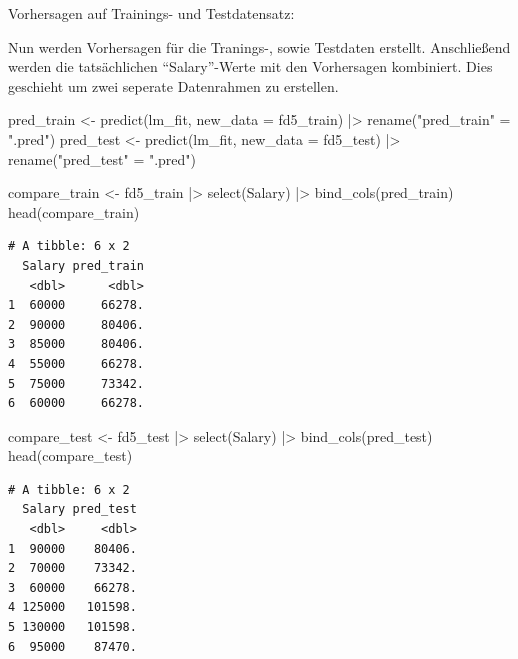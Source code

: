 \documentclass[
  letterpaper,
  DIV=11,
  numbers=noendperiod]{scrartcl}
\newenvironment{Shaded}{\begin{snugshade}}{\end{snugshade}}
\newcommand{\AttributeTok}[1]{\textcolor[rgb]{0.40,0.45,0.13}{#1}}
\newcommand{\FunctionTok}[1]{\textcolor[rgb]{0.28,0.35,0.67}{#1}}
\newcommand{\NormalTok}[1]{\textcolor[rgb]{0.00,0.23,0.31}{#1}}
\newcommand{\OtherTok}[1]{\textcolor[rgb]{0.00,0.23,0.31}{#1}}
\newcommand{\SpecialCharTok}[1]{\textcolor[rgb]{0.37,0.37,0.37}{#1}}
\newcommand{\StringTok}[1]{\textcolor[rgb]{0.13,0.47,0.30}{#1}}
\begin{document}
Vorhersagen auf Trainings- und Testdatensatz:

Nun werden Vorhersagen für die Tranings-, sowie Testdaten erstellt.
Anschließend werden die tatsächlichen ``Salary''-Werte mit den
Vorhersagen kombiniert. Dies geschieht um zwei seperate Datenrahmen zu
erstellen.

\begin{Shaded}
\begin{Highlighting}[]
\NormalTok{pred\_train }\OtherTok{\textless{}{-}} \FunctionTok{predict}\NormalTok{(lm\_fit, }\AttributeTok{new\_data =}\NormalTok{ fd5\_train) }\SpecialCharTok{|\textgreater{}} \FunctionTok{rename}\NormalTok{(}\StringTok{"pred\_train"} \OtherTok{=} \StringTok{".pred"}\NormalTok{)}
\NormalTok{pred\_test }\OtherTok{\textless{}{-}} \FunctionTok{predict}\NormalTok{(lm\_fit, }\AttributeTok{new\_data =}\NormalTok{ fd5\_test) }\SpecialCharTok{|\textgreater{}}  \FunctionTok{rename}\NormalTok{(}\StringTok{"pred\_test"} \OtherTok{=} \StringTok{".pred"}\NormalTok{)}

\NormalTok{compare\_train }\OtherTok{\textless{}{-}}\NormalTok{ fd5\_train }\SpecialCharTok{|\textgreater{}} 
  \FunctionTok{select}\NormalTok{(Salary) }\SpecialCharTok{|\textgreater{}} 
  \FunctionTok{bind\_cols}\NormalTok{(pred\_train)}
\FunctionTok{head}\NormalTok{(compare\_train)}
\end{Highlighting}
\end{Shaded}

\begin{verbatim}
# A tibble: 6 x 2
  Salary pred_train
   <dbl>      <dbl>
1  60000     66278.
2  90000     80406.
3  85000     80406.
4  55000     66278.
5  75000     73342.
6  60000     66278.
\end{verbatim}

\begin{Shaded}
\begin{Highlighting}[]
\NormalTok{compare\_test }\OtherTok{\textless{}{-}}\NormalTok{ fd5\_test }\SpecialCharTok{|\textgreater{}} 
  \FunctionTok{select}\NormalTok{(Salary) }\SpecialCharTok{|\textgreater{}} 
  \FunctionTok{bind\_cols}\NormalTok{(pred\_test)}
\FunctionTok{head}\NormalTok{(compare\_test)}
\end{Highlighting}
\end{Shaded}

\begin{verbatim}
# A tibble: 6 x 2
  Salary pred_test
   <dbl>     <dbl>
1  90000    80406.
2  70000    73342.
3  60000    66278.
4 125000   101598.
5 130000   101598.
6  95000    87470.
\end{verbatim}
\end{document}
